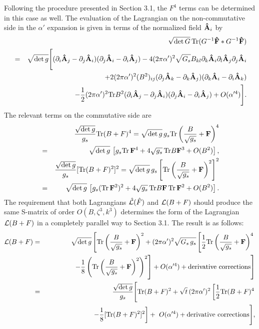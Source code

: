 \documentclass[a4paper,12pt]{article}
\begin{document}
Following the procedure presented in Section 3.1,
the $F^4$ terms can be determined in this case as well.
The evaluation of the Lagrangian on the non-commutative side
in the $\alpha'$ expansion is given 
in terms of the normalized field ${\bf \hat{A}}_i$ by
\begin{eqnarray}
&& \sqrt{\det G} \,
{\rm Tr } (G^{-1} {\bf \hat{F}} \ast G^{-1} {\bf \hat{F}})
\nonumber \\
&=& \sqrt{\det g} \Biggl[
( \partial_i {\bf \hat{A}}_j  - \partial_j {\bf \hat{A}}_i )
( \partial_j {\bf \hat{A}}_i  - \partial_i {\bf \hat{A}}_j )
-4 (2 \pi \alpha')^2 \sqrt{G_s} B_{kl}
\partial_k {\bf \hat{A}}_i
\partial_l {\bf \hat{A}}_j \partial_j {\bf \hat{A}}_i
\nonumber \\
&& +2 (2 \pi \alpha')^2 (B^2)_{ij}
( \partial_j {\bf \hat{A}}_k  - \partial_k {\bf \hat{A}}_j )
( \partial_k {\bf \hat{A}}_i  - \partial_i {\bf \hat{A}}_k )
\nonumber \\
&& -\frac{1}{2} (2 \pi \alpha')^2 {\rm Tr} B^2
( \partial_i {\bf \hat{A}}_j  - \partial_j {\bf \hat{A}}_i )
( \partial_j {\bf \hat{A}}_i  - \partial_i {\bf \hat{A}}_j )
+ O(\alpha'^4) \Biggr].
\label{L-hat-t}
\end{eqnarray}
The relevant terms on the commutative side are
\begin{eqnarray}
&& \frac{\sqrt{\det g}}{g_s} {\rm Tr} (B+F)^4
= \sqrt{\det g} \, g_s {\rm Tr} \left(
\frac{B}{\sqrt{g_s}} + {\bf F} \right)^4
\nonumber \\
&=& \sqrt{\det g} \, \left[
g_s {\rm Tr} \, {\bf F}^4
+ 4 \sqrt{g_s} \, {\rm Tr} B {\bf F}^3 + O(B^2)
\right], \\
&& \frac{\sqrt{\det g}}{g_s} [{\rm Tr} (B+F)^2]^2
= \sqrt{\det g} \, g_s \left[ {\rm Tr} \left(
\frac{B}{\sqrt{g_s}} + {\bf F} \right)^2 \right]^2
\nonumber \\
&=& \sqrt{\det g} \, \left[
g_s ( {\rm Tr} \, {\bf F}^2 )^2
+ 4 \sqrt{g_s} \,
{\rm Tr} B {\bf F} \, {\rm Tr} \, {\bf F}^2 + O(B^2)
\right].
\end{eqnarray}
The requirement that both Lagrangians $\hat{{\cal L}} (\hat{F})$
and ${\cal L} (B+F)$ should produce
the same S-matrix of order $O(B,\zeta^3,k^3)$ determines
the form of the Lagrangian ${\cal L} (B+F)$
in a completely parallel way to Section 3.1.
The result is as follows:
\begin{eqnarray}
{\cal L} (B+F) &=&
\sqrt{\det g} \left[
{\rm Tr}
\left( \frac{B}{\sqrt{g_s}} + {\bf F} \right)^2
+ (2 \pi \alpha')^2 \sqrt{G_s \, g_s}
\left[
\frac{1}{2} {\rm Tr} \left(
\frac{B}{\sqrt{g_s}} + {\bf F} \right)^4
\right. \right. \nonumber \\ && \qquad \qquad \left. \left.
-\frac{1}{8} \left( {\rm Tr} \left(
\frac{B}{\sqrt{g_s}} + {\bf F} \right)^2 \right)^2
\right] + O(\alpha'^4) + {\rm derivative~corrections} \right]
\nonumber \\
&=& \frac{\sqrt{\det g}}{g_s} \Biggl[
{\rm Tr} (B+F)^2
+ \sqrt{t} \, (2 \pi \alpha')^2 \left[
\frac{1}{2} {\rm Tr} (B+F)^4
\right. \nonumber \\ && \qquad \qquad \left.
-\frac{1}{8} [ {\rm Tr} (B+F)^2 ]^2 \right]
+ ~O(\alpha'^4) + {\rm derivative~corrections}
\Biggr],
\label{L-t}
\end{eqnarray}
\end{document}
